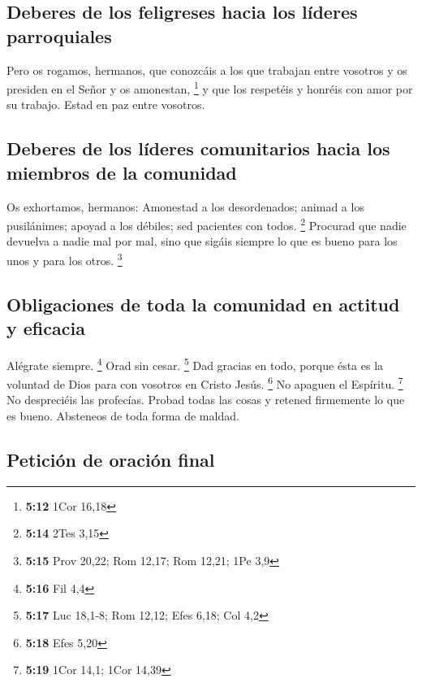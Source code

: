 \begin{paracol}{2}
{\subsection{Deberes de los feligreses hacia los líderes
parroquiales}\label{deberes-de-los-feligreses-hacia-los-luxedderes-parroquiales}}

 Pero os rogamos, hermanos, que conozcáis a los que
trabajan entre vosotros y os presiden en el Señor y os amonestan,
\footnote{\textbf{5:12} 1Cor 16,18}  y que los respetéis
y honréis con amor por su trabajo. Estad en paz entre vosotros.

\hypertarget{deberes-de-los-luxedderes-comunitarios-hacia-los-miembros-de-la-comunidad}{%
\subsection{Deberes de los líderes comunitarios hacia los miembros de la
comunidad}\label{deberes-de-los-luxedderes-comunitarios-hacia-los-miembros-de-la-comunidad}}

 Os exhortamos, hermanos: Amonestad a los desordenados;
animad a los pusilánimes; apoyad a los débiles; sed pacientes con todos.
\footnote{\textbf{5:14} 2Tes 3,15}  Procurad que nadie
devuelva a nadie mal por mal, sino que sigáis siempre lo que es bueno
para los unos y para los otros. \footnote{\textbf{5:15} Prov 20,22; Rom
  12,17; Rom 12,21; 1Pe 3,9}

\hypertarget{obligaciones-de-toda-la-comunidad-en-actitud-y-eficacia}{%
\subsection{Obligaciones de toda la comunidad en actitud y
eficacia}\label{obligaciones-de-toda-la-comunidad-en-actitud-y-eficacia}}

 Alégrate siempre. \footnote{\textbf{5:16} Fil 4,4}
 Orad sin cesar. \footnote{\textbf{5:17} Luc 18,1-8; Rom
  12,12; Efes 6,18; Col 4,2}  Dad gracias en todo, porque
ésta es la voluntad de Dios para con vosotros en Cristo Jesús.
\footnote{\textbf{5:18} Efes 5,20}  No apaguen el
Espíritu. \footnote{\textbf{5:19} 1Cor 14,1; 1Cor 14,39} 
No despreciéis las profecías.  Probad todas las cosas y
retened firmemente lo que es bueno.  Absteneos de toda
forma de maldad.

\hypertarget{peticiuxf3n-de-oraciuxf3n-final}{%
\subsection{Petición de oración
final}\label{peticiuxf3n-de-oraciuxf3n-final}}


\end{paracol}
